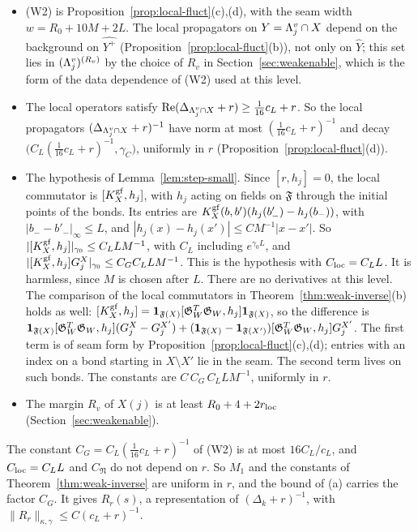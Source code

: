 \begin{enumerate}[label=(L\arabic*)]
\begin{itemize}
  \item (W2) is Proposition~\ref{prop:local-fluct}(c),(d), with the seam width $w=R_0+10M+2L$. The local propagators on $Y=\Lambda^v_j\cap X$ depend on the background on $\widehat{Y^+}$ (Proposition~\ref{prop:local-fluct}(b)), not only on $\hat Y$; this set lies in $(\Lambda^v_j)^{(R_v)}$ by the choice of $R_v$ in Section~\ref{sec:weakenable}, which is the form of the data dependence of (W2) used at this level.
  \item The local operators satisfy $\operatorname{Re}(\Delta_{\Lambda^v_j\cap X}+r)\ge\frac1{16}c_L+r$. So the local propagators $(\Delta_{\Lambda^v_j\cap X}+r)^{-1}$ have norm at most $(\frac1{16}c_L+r)^{-1}$ and decay $\big(C_L(\frac1{16}c_L+r)^{-1},\gamma_C\big)$, uniformly in $r$ (Proposition~\ref{prop:local-fluct}(d)).
  \item The hypothesis of Lemma~\ref{lem:step-small}. Since $[r,h_j]=0$, the local commutator is $[K^{\rm gf}_X,h_j]$, with $h_j$ acting on fields on $\mathfrak F$ through the initial points of the bonds. Its entries are $K^{\rm gf}_X(b,b')(h_j(b'_-)-h_j(b_-))$, with $|b_--b'_-|_\infty\le L$, and $|h_j(x)-h_j(x')|\le CM^{-1}|x-x'|$. So $|[K^{\rm gf}_X,h_j]|_{\gamma_0}\le C_LLM^{-1}$, with $C_L$ including $e^{\gamma_0L}$, and $|[K^{\rm gf}_X,h_j]G^X_j|_{\gamma_0}\le C_GC_LLM^{-1}$. This is the hypothesis with $C_{\rm loc}=C_LL$. It is harmless, since $M$ is chosen after $L$. There are no derivatives at this level. The comparison of the local commutators in Theorem~\ref{thm:weak-inverse}(b) holds as well: $[K^{\rm gf}_X,h_j]=\mathbf 1_{\mathfrak F(X)}[\mathfrak G_W^T\mathfrak G_W,h_j]\mathbf 1_{\mathfrak F(X)}$, so the difference is $\mathbf 1_{\mathfrak F(X)}[\mathfrak G_W^T\mathfrak G_W,h_j](G^X_j-G^{X'}_j)+(\mathbf 1_{\mathfrak F(X)}-\mathbf 1_{\mathfrak F(X')})[\mathfrak G_W^T\mathfrak G_W,h_j]G^{X'}_j$. The first term is of seam form by Proposition~\ref{prop:local-fluct}(c),(d); entries with an index on a bond starting in $X\setminus X'$ lie in the seam. The second term lives on such bonds. The constants are $C\,C_G\,C_LLM^{-1}$, uniformly in $r$.
  \item The margin $R_v$ of $X(j)$ is at least $R_0+4+2r_{\rm loc}$ (Section~\ref{sec:weakenable}).
  \end{itemize}
  The constant $C_G=C_L(\frac1{16}c_L+r)^{-1}$ of (W2) is at most $16C_L/c_L$, and $C_{\rm loc}=C_LL$ and $C_{\mathfrak N}$ do not depend on $r$. So $M_1$ and the constants of Theorem~\ref{thm:weak-inverse} are uniform in $r$, and the bound of (a) carries the factor $C_G$. It gives $R_r(s)$, a representation of $(\Delta_k+r)^{-1}$, with $\|R_r\|_{\kappa,\gamma}\le C(c_L+r)^{-1}$.
\end{enumerate}


